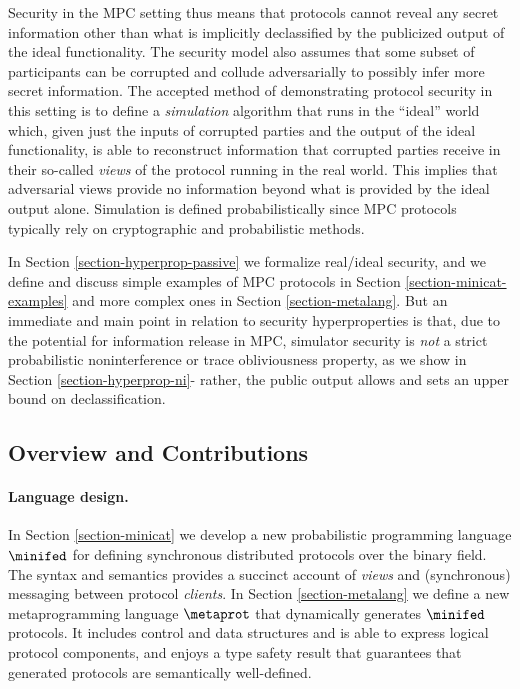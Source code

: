 Security in the MPC setting thus means that protocols cannot reveal
any secret information other than what is implicitly declassified by
the publicized output of the ideal functionality. The security model
also assumes that some subset of participants can be corrupted and
collude adversarially to possibly infer more secret information. The
accepted method of demonstrating protocol security in this setting is
to define a \emph{simulation} algorithm that runs in the ``ideal''
world which, given just the inputs of corrupted parties and the output
of the ideal functionality, is able to reconstruct information that
corrupted parties receive in their so-called \emph{views} of the
protocol running in the real world.  This implies that adversarial
views provide no information beyond what is provided by the ideal
output alone. Simulation is defined probabilistically since MPC
protocols typically rely on cryptographic and probabilistic methods.

In Section \ref{section-hyperprop-passive} we formalize real/ideal
security, and we define and discuss simple examples of MPC protocols
in Section \ref{section-minicat-examples} and more complex ones in
Section \ref{section-metalang}. But an immediate and main point in
relation to security hyperproperties is that, due to the potential for
information release in MPC, simulator security is \emph{not} a strict
probabilistic noninterference or trace obliviousness property, as we
show in Section \ref{section-hyperprop-ni}- rather, the public output
allows and sets an upper bound on declassification.

\subsection{Overview and Contributions}

\paragraph{Language design.} In Section \ref{section-minicat} we
develop a new probabilistic programming language $\minifed$ for
defining synchronous distributed protocols over the binary field. The
syntax and semantics provides a succinct account of \emph{views} and
(synchronous) messaging between protocol \emph{clients}. In Section
\ref{section-metalang} we define a new metaprogramming language
$\metaprot$ that dynamically generates $\minifed$ protocols. It
includes control and data structures and is able to express logical
protocol components, and enjoys a type safety result that guarantees
that generated protocols are semantically well-defined.

